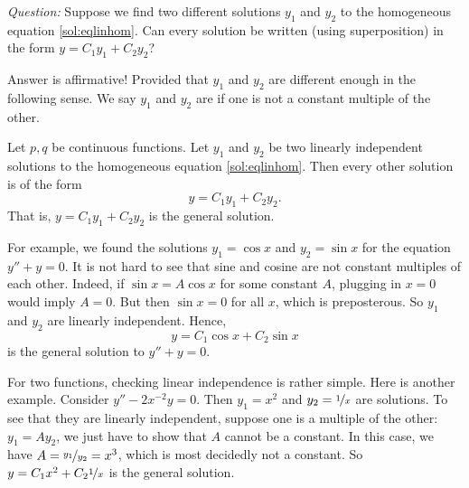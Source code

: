 \emph{Question:} Suppose we find two different solutions $y_1$ and $y_2$ to the
homogeneous equation \eqref{sol:eqlinhom}.  Can every solution
be written (using superposition) in the form
$y = C_1 y_1 + C_2 y_2$?

Answer is affirmative!  Provided that $y_1$ and $y_2$ are different enough in
the following sense.  We say $y_1$ and $y_2$ are \emph{} if one is not a constant multiple of the other.

\begin{theorem}
Let $p, q$ be continuous functions.
Let $y_1$ and $y_2$ be two linearly independent
solutions to the homogeneous equation \eqref{sol:eqlinhom}. 
Then every other solution is 
of the form
\begin{equation*}
y = C_1 y_1 + C_2 y_2 .
\end{equation*}
That is, $y = C_1 y_1 + C_2 y_2$ is the general solution.
\end{theorem}

For example, we found the solutions
$y_1 = \cos x$ and $y_2 = \sin x$ for the
equation $y'' + y = 0$.  It is not hard to see that sine and cosine are not
constant
multiples of each other.  Indeed, if $\sin x = A \cos x$ for some constant $A$,
plugging in $x=0$ would imply $A = 0$.  But then $\sin x = 0$ for all
$x$, which is preposterous.
So $y_1$ and $y_2$ are linearly independent.  Hence,
\begin{equation*}
y = C_1 \cos x + C_2 \sin x 
\end{equation*}
is the general solution to $y'' + y = 0$.

For two functions, checking linear independence is rather simple.  Here is
another example.  Consider $y''-2x^{-2}y = 0$.  Then $y_1 = x^2$ and $y_2 =
\nicefrac{1}{x}$ are solutions.  To see that they are linearly independent,
suppose one is a multiple of the other: $y_1 = A y_2$, we just have to show
that $A$ cannot be a constant.  In this case, we have $A =
\nicefrac{y_1}{y_2} = x^3$, which is most decidedly not a constant.
So $y = C_1 x^2 + C_2 \nicefrac{1}{x}$ is the general solution.

\medskip

